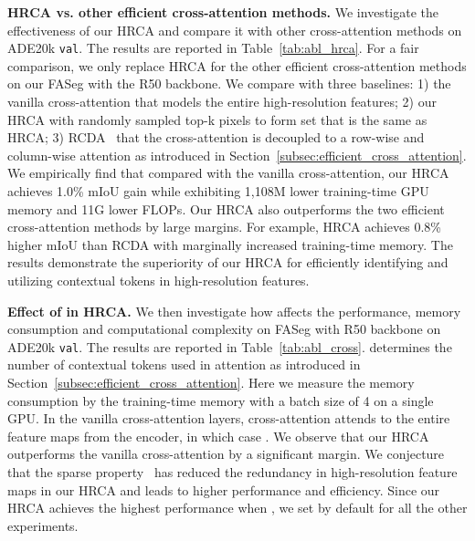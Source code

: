 \begin{table}[t!]
\centering
\caption{Effect of  in our efficient HRCA on ADE20K \texttt{val}~\cite{zhou2017scene} with 150 categories. \#F indicates the number of FLOPs (G).}
\vspace{-0.5em}
\label{tab:abl_cross}
  \vspace{-1em}
\end{table}

\noindent\textbf{HRCA vs. other efficient cross-attention methods.} We investigate the effectiveness of our HRCA and compare it with other cross-attention methods on ADE20k \texttt{val}. The results are reported in Table~\ref{tab:abl_hrca}. For a fair comparison, we only replace HRCA for the other efficient cross-attention methods on our FASeg with the R50 backbone. We compare with three baselines: 1) the vanilla cross-attention that models the entire high-resolution features; 2) our HRCA with randomly sampled top-k pixels to form set  that  is the same as HRCA; 3) RCDA~\cite{wang2021anchor} that the cross-attention is decoupled to a row-wise and column-wise attention as introduced in Section~\ref{subsec:efficient_cross_attention}. We empirically find that compared with the vanilla cross-attention, our HRCA achieves 1.0\% mIoU gain while exhibiting 1,108M lower training-time GPU memory and 11G lower FLOPs. Our HRCA also outperforms the two efficient cross-attention methods by large margins. For example, HRCA achieves 0.8\% higher mIoU than RCDA with marginally increased training-time memory. The results demonstrate the superiority of our HRCA for efficiently identifying and utilizing contextual tokens in high-resolution features.

\noindent\textbf{Effect of  in HRCA.} We then investigate how  affects the performance, memory consumption and computational complexity on FASeg with R50 backbone on ADE20k \texttt{val}. The results are reported in Table~\ref{tab:abl_cross}.  determines the number of contextual tokens used in attention as introduced in Section~\ref{subsec:efficient_cross_attention}. Here we measure the memory consumption by the training-time memory with a batch size of 4 on a single GPU. In the vanilla cross-attention layers, cross-attention attends to the entire feature maps from the encoder, in which case . We observe that our HRCA outperforms the vanilla cross-attention by a significant margin.  We conjecture that the sparse property~\cite{frankle2018the,evci2020rigging} has reduced the redundancy in high-resolution feature maps in our HRCA and leads to higher performance and efficiency. Since our HRCA achieves the highest performance when , we set  by default for all the other experiments.


